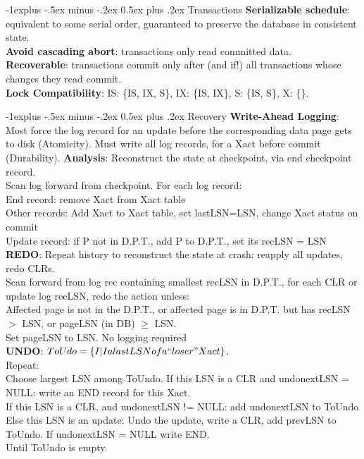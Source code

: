 \documentclass[10pt,landscape]{article}
\makeatletter
\renewcommand{\subsection}{\@startsection{subsection}{2}{0mm}%
                                {-1explus -.5ex minus -.2ex}%
                                {0.5ex plus .2ex}%
                                {\normalfont\normalsize\bfseries}}
\makeatother
\begin{document}
\begin{multicols}{3}
\subsection{Transactions}
{\bf Serializable schedule}: equivalent to some serial order, guaranteed to preserve the database in consistent state.\\
{\bf Avoid cascading abort}: transactions only read committed data.\\
{\bf Recoverable}: transactions commit only after (and if!) all transactions whose changes they read commit.\\
{\bf Lock Compatibility}: IS: \{IS, IX, S\}, IX: \{IS, IX\}, S: \{IS, S\}, X: \{\}.

\subsection{Recovery}
{\bf Write-Ahead Logging}: Most force the log record for an update before the corresponding data page gets to disk (Atomicity). Must write all log records, for a Xact before commit (Durability).
{\bf Analysis}: Reconstruct the state at checkpoint, via end checkpoint record.\\
Scan log forward from checkpoint. For each log record:\\
End record: remove Xact from Xact table\\
Other records: Add Xact to Xact table, set lastLSN=LSN, change Xact status on commit\\
Update record: if P not in D.P.T., add P to D.P.T., set its recLSN = LSN\\
{\bf REDO}: Repeat history to reconstruct the state at crash: reapply all updates, redo CLRs.\\
Scan forward from log rec containing smallest recLSN in D.P.T., for each CLR or update log recLSN, redo the action unless:\\
Affected page is not in the D.P.T., or affected page is in D.P.T. but has recLSN $>$ LSN, or pageLSN (in DB) $\ge$ LSN.\\
Set pageLSN to LSN. No logging required\\
{\bf UNDO}: $ToUdo = \{I | I a lastLSN of a ``loser" Xact\}$. \\
Repeat: \\
Choose largest LSN among ToUndo.
If this LSN is a CLR and undonextLSN = NULL: write an END record for this Xact.\\
If this LSN is a CLR, and undonextLSN != NULL: add undonextLSN to ToUndo\\
Else this LSN is an update: Undo the update, write a CLR, add prevLSN to ToUndo. If undonextLSN = NULL write END.\\
Until ToUndo is empty.\\

\scriptsize


\end{multicols}
\end{document}
